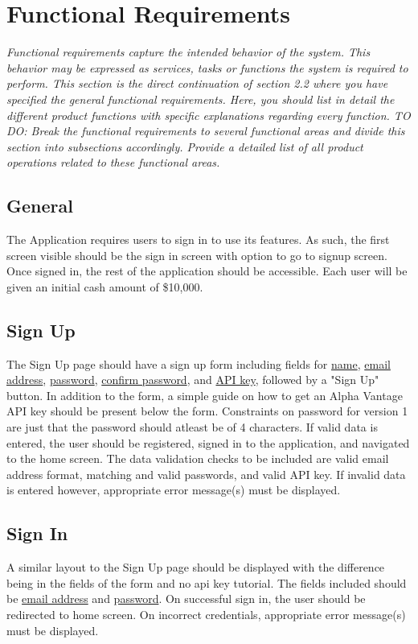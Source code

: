 \documentclass[12 pt, a4paper]{report}
\begin{document}
	\section {Functional Requirements}
	\textit{Functional requirements capture the intended behavior of the system. This behavior may be expressed as services, tasks or functions the system is required to perform. This section is the direct continuation of section 2.2 where you have specified the general functional requirements. Here, you should list in detail the different product functions with specific explanations regarding every function. 
	TO DO: Break the functional requirements to several functional areas and divide this section into subsections accordingly. Provide a detailed list of all product operations related to these functional areas.}
	\subsection{General}
	The Application requires users to sign in to use its features. As such, the first screen visible should be the sign in screen with option to go to signup screen. Once signed in, the rest of the application should be accessible.
	Each user will be given an initial cash amount of \$10,000.
	\subsection{Sign Up}
	The Sign Up page should have a sign up form including fields for \underline{name}, \underline{email address}, \underline{password}, \underline{confirm password}, and \underline{API key}, followed by a "Sign Up" button. In addition to the form, a simple guide on how to get an Alpha Vantage API key should be present below the form. Constraints on password for version 1 are just that the password should atleast be of 4 characters. If valid data is entered, the user should be registered, signed in to the application, and navigated to the home screen. The data validation checks to be included are valid email address format, matching and valid passwords, and valid API key. If invalid data is entered however, appropriate error message(s) must be displayed.

	
	\subsection{Sign In}
	A similar layout to the Sign Up page should be displayed with the difference being in the fields of the form and no api key tutorial. The fields included should be \underline{email address} and \underline{password}. On successful sign in, the user should be redirected to home screen. On incorrect credentials, appropriate error message(s) must be displayed.
\end{document}
